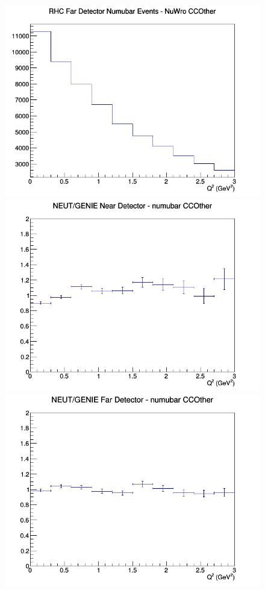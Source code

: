 \begin{figure}[h]
\endminipage
{}
\includegraphics[width=\linewidth]{eff_Q2/GAr/CCOther_RHC_FD_numubar_Q2_NuWro.png}
\endminipage
\newline
{}
\includegraphics[width=\linewidth]{eff_Q2/GAr/ratios/CCOther_NEUT_GENIE_numubar_near_Q2.png}
\endminipage
{}
\includegraphics[width=\linewidth]{eff_Q2/GAr/ratios/CCOther_NEUT_GENIE_numubar_far_Q2.png}

\end{figure}
